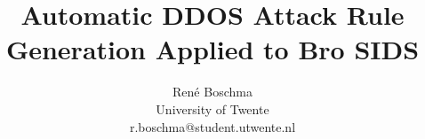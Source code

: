 \documentclass[10pt, a5paper]{article}
\begin{document}
 

\title{Automatic DDOS Attack Rule Generation Applied to Bro SIDS}
\author{René Boschma\\University of Twente\\r.boschma@student.utwente.nl}
\date{}
\maketitle


\newpage






\newpage


\end{document}
